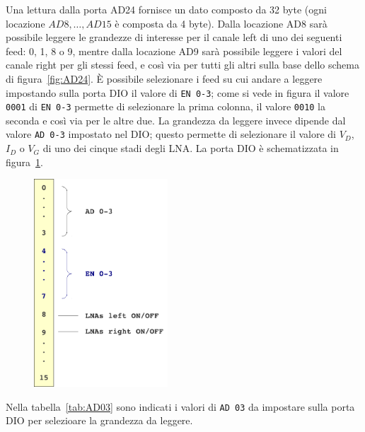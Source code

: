 Una lettura dalla porta AD24 fornisce un dato composto da 32 byte (ogni locazione $AD8, \dots, AD15$
\`e composta da 4 byte). Dalla locazione AD8 sar\`a possibile leggere le grandezze di interesse per il 
canale left di uno dei seguenti feed: 0, 1, 8 o 9, mentre dalla locazione AD9 sar\`a possibile leggere
i valori del canale right per gli stessi feed, e cos\`i via per tutti gli altri sulla base dello schema
di figura~\ref{fig:AD24}. \`E possibile selezionare i feed su cui andare a leggere impostando sulla porta
DIO il valore di \texttt{EN 0-3}; come si vede in figura il valore \texttt{0001} di \texttt{EN 0-3} permette
di selezionare la prima colonna, il valore \texttt{0010} la seconda e cos\`i via per le altre due. La grandezza
da leggere invece dipende dal valore \texttt{AD 0-3} impostato nel DIO; questo permette di selezionare il valore di
$V_D$, $I_D$ o $V_G$ di uno dei cinque stadi degli LNA. La porta DIO \`e schematizzata in figura~\ref{fig:DIO}.
\begin{center}
\begin{figure}[!htbp]
        \begin{center}
        \includegraphics[width=5cm]{figure/DIO}
        \end{center}
         \label{fig:DIO}
\end{figure}
\end{center}
Nella tabella~\ref{tab:AD03} sono indicati i valori di \texttt{AD 03} da impostare sulla porta DIO
per selezioare la grandezza da leggere.
\renewcommand\arraystretch{1.2}
